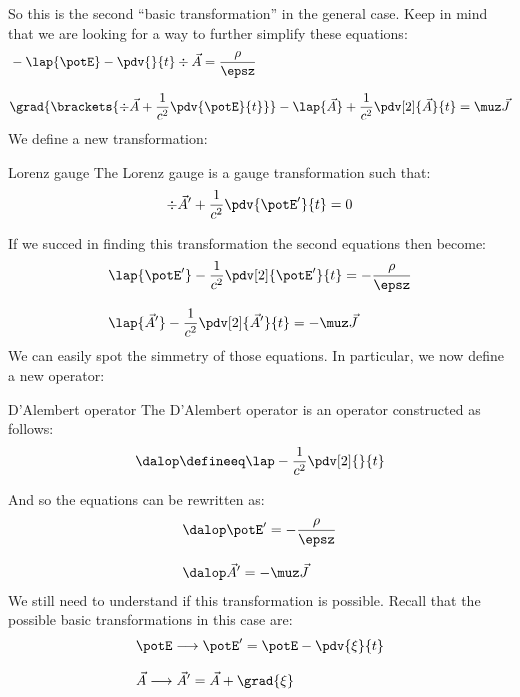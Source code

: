 So this is the second ``basic transformation'' in the general case. Keep in mind that we are looking for a way to further simplify these equations:
\begin{equation}
  \begin{split}
    &-\lap{\potE} -\pdv{}{t}\div{\vec{A}} = \dfrac{\rho}{\epsz} \\[8pt]
    &\grad{\brackets{\div{\vec{A}}+ \dfrac{1}{c^2}\pdv{\potE}{t}}} - \lap{\vec{A}} + \dfrac{1}{c^2} \pdv[2]{\vec{A}}{t} = \muz \vec{J}
  \end{split}
\end{equation}
We define a new transformation:
\begin{definition}{Lorenz gauge}
  The Lorenz gauge is a gauge transformation such that:
  \begin{equation} \label{e:Lorentz_gauge}
    \div{\vec{A}'}+ \dfrac{1}{c^2}\pdv{\potE'}{t} = 0
  \end{equation}
\end{definition}
If we succed in finding this transformation the second equations then become:
\begin{equation}
  \begin{split}
    &\lap{\potE'} - \dfrac{1}{c^2} \pdv[2]{\potE'}{t} = -\dfrac{\rho}{\epsz} \\[8pt]
    &\lap{\vec{A}'} - \dfrac{1}{c^2} \pdv[2]{\vec{A}'}{t} = -\muz \vec{J}
  \end{split}
\end{equation}
We can easily spot the simmetry of those equations. In particular, we now define a new operator:
\begin{definition}{D'Alembert operator}
  The D'Alembert operator is an operator constructed as follows:
  \begin{equation}
    \dalop \defineeq \lap - \dfrac{1}{c^2} \pdv[2]{}{t}
  \end{equation}
\end{definition}
And so the equations can be rewritten as:
\begin{equation}
  \begin{split}
    &\dalop \potE' = -\dfrac{\rho}{\epsz} \\[8pt]
    &\dalop \vec{A}' = -\muz \vec{J}
  \end{split}
\end{equation}
We still need to understand if this transformation is possible. Recall that the possible basic transformations in this case are:
\begin{equation}
  \begin{split}
    &\potE \longrightarrow \potE' = \potE - \pdv{\xi}{t}\\[8pt]
    &\vec{A} \longrightarrow \vec{A}' = \vec{A} + \grad{\xi}
  \end{split}
\end{equation}
